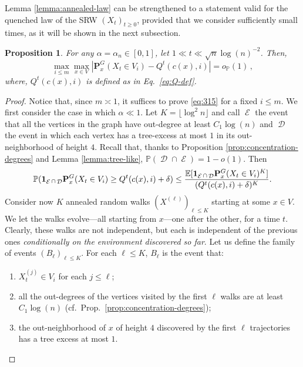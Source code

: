 \documentclass[11pt,oneside]{amsart}
\numberwithin{equation}{section}  %
\theoremstyle{plain}
\newtheorem{proposition}[theorem]{Proposition}
\DeclareMathOperator{\cD}{\mathcal{D}}
\DeclareMathOperator{\cE}{\mathcal{E}}
\newcommand{\E}{\mathbb{E}}
\newcommand{\p}{\mathbb{P}}
\newcommand{\PP}{\mathbb{P}}
\newcommand{\one}{\textup{\textbf{1}}}
\newcommand{\op}{o_{\p}}
\newcommand{\quenchG}{\mathbf{P}^G}
\newcommand{\semi}{{Q}}
\begin{document}
Lemma \ref{lemma:annealed-law} can be strengthened to a statement valid for the quenched law of the SRW $(X_t)_{t \ge0}$, provided that we consider sufficiently small times, as it will be shown in the next subsection.
%
    \begin{proposition} \label{prop:quenched-law}
		For any $\alpha=\alpha_n\in[0,1]$, let $1\ll t \ll \sqrt{n}\log(n)^{-2} $. Then, 
		\begin{equation}\label{eq:315}
		\max_{i \le m}\max_{x \in V}
		\left| \quenchG_x(X_t \in V_i) - \semi^t(c(x),i)\right|
		=\op(1)\,,
		\end{equation}
		where, $\semi^t(c(x),i)$ is defined as in Eq.~\eqref{eq:Q-def}.
	\end{proposition}
		\begin{proof} 
		Notice that, since $m\asymp 1$, it suffices to prove \eqref{eq:315} for a fixed $i\le m$.
            We first consider the case in which $\alpha\ll 1$. Let $K=\lfloor \log^2 n \rfloor$ and call $\cE$ the event that all the vertices in the graph have out-degree at least $C_1\log(n)$ and $\cD$ the event in which each vertex has a tree-excess at most $1$ in its out-neighborhood of height $4$. Recall that, thanks to  Proposition \ref{prop:concentration-degrees} and Lemma \ref{lemma:tree-like}, $\PP(\cD\cap \cE)=1-o(1)$.
			Then
			\begin{equation}
			\p(\one_{\cE\cap\cD}\quenchG_x(X_t\in V_i)\ge \semi^t(c(x),i)+ \delta) \le \frac{\E[\one_{\cE\cap\cD}\quenchG_x(X_t\in V_i)^K]}{(\semi^t(c(x),i)+ \delta)^K}.
			\end{equation}
			Consider now $K$ annealed random walks $(X^{(\ell)})_{\ell\le K}$ starting at some $x\in V$. We let the walks evolve---all starting from $x$---one after the other, for a time $t$. Clearly, these walks are not independent, but each is independent of the previous ones \emph{conditionally on the environment discovered so far}.
			Let us define the family of events $(B_\ell)_{\ell \le K}$. For each $\ell \le K$, $B_\ell$ is the event that:
			\begin{enumerate}
				\item[(i)] $X^{(j)}_t \in V_i$ for each $j \le \ell$;
				\item[(ii)] all the out-degrees of the vertices visited by the first $\ell$ walks are at least $C_1\log(n)$ (cf.~Prop.~\ref{prop:concentration-degrees});
				\item[(iii)] the out-neighborhood of $x$ of height $4$ discovered by the first $\ell$ trajectories has a tree excess at most $1$.
			\end{enumerate}

\end{proof}
\end{document}
